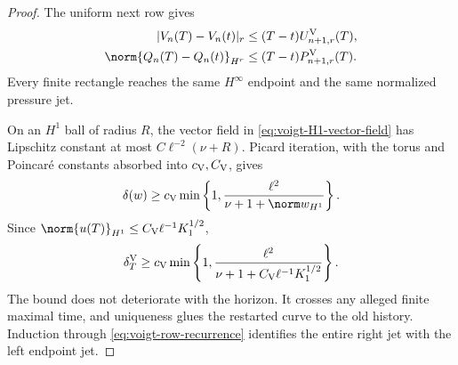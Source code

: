 \begin{proof}
The uniform next row gives
\begin{align}
 |V_n(T)-V_n(t)|_r
 &\le(T-t)U_{n+1,r}^{\rm V}(T),
 \label{eq:voigt-endpoint-modulus}\\
 \norm{Q_n(T)-Q_n(t)}_{H^r}
 &\le(T-t)P_{n+1,r}^{\rm V}(T).
 \label{eq:voigt-pressure-endpoint-modulus}
\end{align}
Every finite rectangle reaches the same \(H^\infty\) endpoint and the same
normalized pressure jet.

On an \(H^1\) ball of radius \(R\), the vector field in
\eqref{eq:voigt-H1-vector-field} has Lipschitz constant at most
\(C\ell^{-2}(\nu+R)\).  Picard iteration, with the torus and Poincar\'e
constants absorbed into \(c_{\rm V},C_{\rm V}\), gives
\begin{equation}
 \delta(w)
 \ge c_{\rm V}\min\left\{1,
 \frac{\ell^2}{\nu+1+\norm w_{H^1}}
 \right\}.
 \label{eq:voigt-local-lifespan}
\end{equation}
Since \(\norm{u(T)}_{H^1}\le C_{\rm V}\ell^{-1}K_1^{1/2}\),
\begin{equation}
 \delta_T^{\rm V}
 \ge c_{\rm V}\min\left\{1,
 \frac{\ell^2}{\nu+1+C_{\rm V}\ell^{-1}K_1^{1/2}}
 \right\}.
 \label{eq:voigt-restart}
\end{equation}
The bound does not deteriorate with the horizon.  It crosses any alleged
finite maximal time, and uniqueness glues the restarted curve to the old
history.  Induction through \eqref{eq:voigt-row-recurrence} identifies the
entire right jet with the left endpoint jet.


\end{proof}
